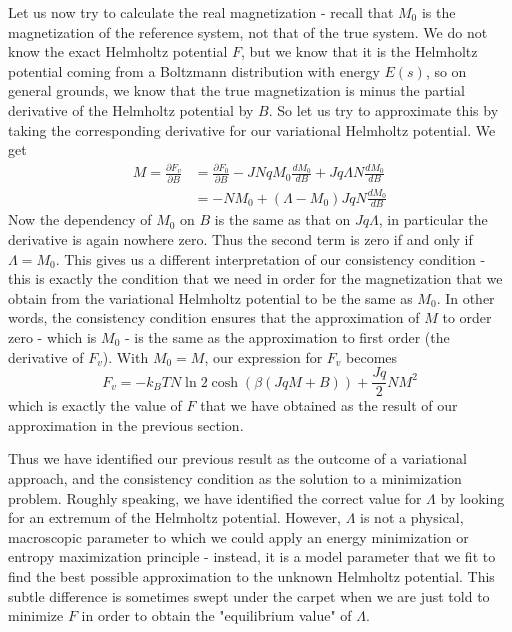 \documentclass[a4paper, draft]{article}
\theoremstyle{own}
\theoremstyle{remark}
\begin{document}
Let us now try to calculate the real magnetization - recall that $M_0$ is the magnetization of the reference system, not that of the true system. We do not know the exact Helmholtz potential $F$, but we know that it is the Helmholtz potential coming from a Boltzmann distribution with energy $E(s)$, so on general grounds, we know that the true magnetization is minus the partial derivative of the Helmholtz potential by $B$. So let us try to approximate this by taking the corresponding derivative for our variational Helmholtz potential. We get
\begin{align*}
M = \frac{\partial F_v}{\partial B} &= \frac{\partial F_0}{\partial B}  -  J N q M_0 \frac{dM_0}{d B}  + J q \Lambda N \frac{dM_0}{d B} \\
&= - N M_0 + (\Lambda -  M_0) J q N \frac{dM_0}{d B} 
\end{align*}
Now the dependency of $M_0$ on $B$ is the same as that on $J q \Lambda$, in particular the derivative is again nowhere zero. Thus the second term is zero if and only if $\Lambda = M_0$. 
This gives us a different interpretation of our consistency condition - this is exactly the condition that we need in order for the magnetization that we obtain from the variational Helmholtz potential to be the same as $M_0$. In other words, the consistency condition ensures that the approximation of $M$ to order zero - which is $M_0$ - is the same as the approximation to first order (the derivative of $F_v$). With $M_0 = M$, our expression for $F_v$ becomes
$$
F_v = - k_B T N \ln 2 \cosh(\beta(JqM + B)) + \frac{Jq}{2}  N M^2 
$$
which is exactly the value of $F$ that we have obtained as the result of our approximation in the previous section.

Thus we have identified our previous result as the outcome of a variational approach, and the consistency condition as the solution to a minimization problem. Roughly speaking, we have identified the correct value for $\Lambda$ by looking for an extremum of the Helmholtz potential. However, $\Lambda$ is not a physical, macroscopic parameter to which we could apply an energy minimization or entropy maximization principle - instead, it is a model parameter that we fit to find the best possible approximation to the unknown Helmholtz potential. This subtle difference is sometimes swept under the carpet when we are just told to minimize $F$ in order to obtain the "equilibrium value" of $\Lambda$. 
\end{document}
